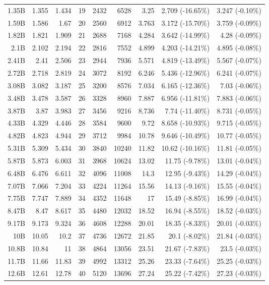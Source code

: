\begin{table}[h]
\begin{tabular}{rrrrrrrrr}
1.35B & 1.355 & 1.434 & 19 & 2432 & 6528 & 3.25 & 2.709 (-16.65\%) & 3.247 (-0.10\%)\\
1.59B & 1.586 & 1.67 & 20 & 2560 & 6912 & 3.763 & 3.172 (-15.70\%) & 3.759 (-0.09\%)\\
1.82B & 1.821 & 1.909 & 21 & 2688 & 7168 & 4.284 & 3.642 (-14.99\%) & 4.28 (-0.09\%)\\
2.1B & 2.102 & 2.194 & 22 & 2816 & 7552 & 4.899 & 4.203 (-14.21\%) & 4.895 (-0.08\%)\\
2.41B & 2.41 & 2.506 & 23 & 2944 & 7936 & 5.571 & 4.819 (-13.49\%) & 5.567 (-0.07\%)\\
2.72B & 2.718 & 2.819 & 24 & 3072 & 8192 & 6.246 & 5.436 (-12.96\%) & 6.241 (-0.07\%)\\
3.08B & 3.082 & 3.187 & 25 & 3200 & 8576 & 7.034 & 6.165 (-12.36\%) & 7.03 (-0.06\%)\\
3.48B & 3.478 & 3.587 & 26 & 3328 & 8960 & 7.887 & 6.956 (-11.81\%) & 7.883 (-0.06\%)\\
3.87B & 3.87 & 3.983 & 27 & 3456 & 9216 & 8.736 & 7.74 (-11.40\%) & 8.731 (-0.05\%)\\
4.33B & 4.329 & 4.446 & 28 & 3584 & 9600 & 9.72 & 8.658 (-10.93\%) & 9.715 (-0.05\%)\\
4.82B & 4.823 & 4.944 & 29 & 3712 & 9984 & 10.78 & 9.646 (-10.49\%) & 10.77 (-0.05\%)\\
5.31B & 5.309 & 5.434 & 30 & 3840 & 10240 & 11.82 & 10.62 (-10.16\%) & 11.81 (-0.05\%)\\
5.87B & 5.873 & 6.003 & 31 & 3968 & 10624 & 13.02 & 11.75 (-9.78\%) & 13.01 (-0.04\%)\\
6.48B & 6.476 & 6.611 & 32 & 4096 & 11008 & 14.3 & 12.95 (-9.43\%) & 14.29 (-0.04\%)\\
7.07B & 7.066 & 7.204 & 33 & 4224 & 11264 & 15.56 & 14.13 (-9.16\%) & 15.55 (-0.04\%)\\
7.75B & 7.747 & 7.889 & 34 & 4352 & 11648 & 17 & 15.49 (-8.85\%) & 16.99 (-0.04\%)\\
8.47B & 8.47 & 8.617 & 35 & 4480 & 12032 & 18.52 & 16.94 (-8.55\%) & 18.52 (-0.03\%)\\
9.17B & 9.173 & 9.324 & 36 & 4608 & 12288 & 20.01 & 18.35 (-8.33\%) & 20.01 (-0.03\%)\\
10B & 10.05 & 10.2 & 37 & 4736 & 12672 & 21.85 & 20.1 (-8.02\%) & 21.84 (-0.03\%)\\
10.8B & 10.84 & 11 & 38 & 4864 & 13056 & 23.51 & 21.67 (-7.83\%) & 23.5 (-0.03\%)\\
11.7B & 11.66 & 11.83 & 39 & 4992 & 13312 & 25.26 & 23.33 (-7.64\%) & 25.25 (-0.03\%)\\
12.6B & 12.61 & 12.78 & 40 & 5120 & 13696 & 27.24 & 25.22 (-7.42\%) & 27.23 (-0.03\%)\\
\bottomrule
\end{tabular}
\end{table}
